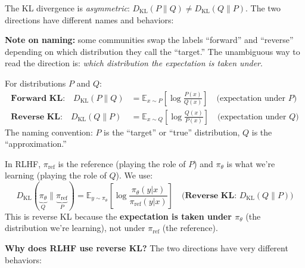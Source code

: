 \begin{remark}
    The KL divergence is \emph{asymmetric}: $D_{\mathrm{KL}}(P \| Q) \neq D_{\mathrm{KL}}(Q \| P)$. The two directions have different names and behaviors:

    \textbf{Note on naming:} some communities swap the labels ``forward'' and ``reverse'' depending on which distribution they call the ``target.'' The unambiguous way to read the direction is: \emph{which distribution the expectation is taken under}.

    \begin{definition}
        For distributions $P$ and $Q$:
        \begin{align*}
            \textbf{Forward KL:} \quad D_{\mathrm{KL}}(P \| Q) & = \mathbb{E}_{x \sim P}\left[\log \frac{P(x)}{Q(x)}\right] \quad \text{(expectation under $P$)} \\[6pt]
            \textbf{Reverse KL:} \quad D_{\mathrm{KL}}(Q \| P) & = \mathbb{E}_{x \sim Q}\left[\log \frac{Q(x)}{P(x)}\right] \quad \text{(expectation under $Q$)}
        \end{align*}
        The naming convention: $P$ is the ``target'' or ``true'' distribution, $Q$ is the ``approximation.''
    \end{definition}

    In RLHF, $\pi_{\text{ref}}$ is the reference (playing the role of $P$) and $\pi_\theta$ is what we're learning (playing the role of $Q$). We use:
    \[
        D_{\mathrm{KL}}(\underbrace{\pi_\theta}_{Q} \| \underbrace{\pi_{\text{ref}}}_{P}) = \mathbb{E}_{y \sim \pi_\theta}\left[\log \frac{\pi_\theta(y|x)}{\pi_{\text{ref}}(y|x)}\right] \quad \textbf{(Reverse KL: $D_{\mathrm{KL}}(Q \| P)$)}
    \]
    This is reverse KL because the \textbf{expectation is taken under $\pi_\theta$} (the distribution we're learning), not under $\pi_{\text{ref}}$ (the reference).

    \textbf{Why does RLHF use reverse KL?} The two directions have very different behaviors:

    \begin{center}
\end{center}
\end{remark}
